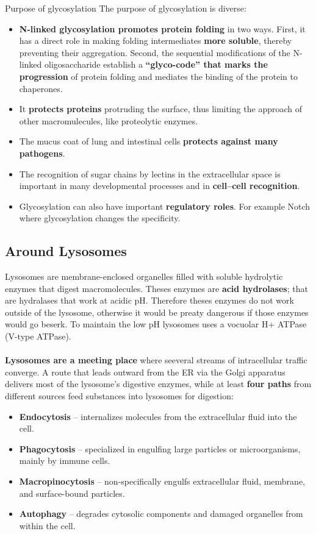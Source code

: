 \documentclass[../main.tex]{subfiles}
\begin{document}
\begin{RemarkWithTitel}{Purpose of glycosylation}
	The purpose of glycosylation is diverse: 
	\begin{itemize}
		\item  \textbf{N-linked glycosylation promotes protein folding} in two ways. First, it has a direct role in making folding intermediates \textbf{more soluble}, thereby preventing their aggregation. Second, the sequential modifications of the N-linked oligosaccharide establish a \textbf{“glyco-code” that marks the progression} of protein folding and mediates the binding of the protein to chaperones. 
		\item It \textbf{protects proteins} protruding the surface, thus limiting the approach of other macromulecules, like proteolytic enzymes. 
		\item The mucus coat of lung and intestinal cells \textbf{protects against many pathogens}.
		\item The recognition of sugar chains by lectins in the extracellular space is important in many developmental processes and in \textbf{cell–cell recognition}. 
		\item Glycosylation can also have important \textbf{regulatory roles}. For example Notch where glycosylation changes the specificity. 
	\end{itemize}
\end{RemarkWithTitel}

\subsection{Around Lysosomes}

Lysosomes are membrane-enclosed organelles filled with soluble hydrolytic enzymes that digest macromolecules. Theses enzymes are \textbf{acid hydrolases}; that are hydralases that work at acidic pH. Therefore theses enzymes do  not work outside of the lysosome, otherwise it would be preaty dangerous if those enzymes would go beserk. To maintain the low pH lysosomes uses a vocuolar H+ ATPase (V-type ATPase). \\
\\
\textbf{Lysosomes are a meeting place} where seeveral streams of intracellular traffic converge. A route that leads outward from the ER via the Golgi apparatus delivers most of the lysosome’s digestive enzymes, while at least \textbf{four paths} from different sources feed substances into lysosomes for digestion: 
\begin{itemize}
	\item \textbf{Endocytosis} – internalizes molecules from the extracellular fluid into the cell.
	\item \textbf{Phagocytosis} – specialized in engulfing large particles or microorganisms, mainly by immune cells.
	\item \textbf{Macropinocytosis} – non-specifically engulfs extracellular fluid, membrane, and surface-bound particles.
	\item \textbf{Autophagy} – degrades cytosolic components and damaged organelles from within the cell.
\end{itemize}
\end{document}
